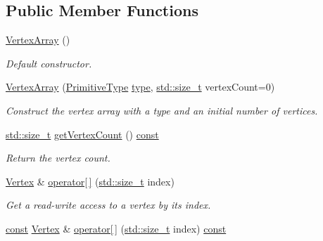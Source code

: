 \subsection*{Public Member Functions}
\begin{DoxyCompactItemize}
\item 
\hyperlink{classsf_1_1_vertex_array_a15729e01df8fc0021f9774dfb56295c1}{Vertex\-Array} ()
\begin{DoxyCompactList}\small\item\em Default constructor. \end{DoxyCompactList}\item 
\hyperlink{classsf_1_1_vertex_array_a4bb1c29a0e3354a035075899d84f02f9}{Vertex\-Array} (\hyperlink{group__graphics_ga5ee56ac1339984909610713096283b1b}{Primitive\-Type} \hyperlink{_entity_8cpp_aa209819775142a76b8e49319d79ecab2}{type}, \hyperlink{nc__alloc_8h_a7b60c5629e55e8ec87a4547dd4abced4}{std\-::size\-\_\-t} vertex\-Count=0)
\begin{DoxyCompactList}\small\item\em Construct the vertex array with a type and an initial number of vertices. \end{DoxyCompactList}\item 
\hyperlink{nc__alloc_8h_a7b60c5629e55e8ec87a4547dd4abced4}{std\-::size\-\_\-t} \hyperlink{classsf_1_1_vertex_array_afcf63214ffaf5903c818d7f2bf49970b}{get\-Vertex\-Count} () \hyperlink{term__entry_8h_a57bd63ce7f9a353488880e3de6692d5a}{const} 
\begin{DoxyCompactList}\small\item\em Return the vertex count. \end{DoxyCompactList}\item 
\hyperlink{classsf_1_1_vertex}{Vertex} \& \hyperlink{classsf_1_1_vertex_array_a6006676417d91f42d0278f1abcfe4352}{operator\mbox{[}$\,$\mbox{]}} (\hyperlink{nc__alloc_8h_a7b60c5629e55e8ec87a4547dd4abced4}{std\-::size\-\_\-t} index)
\begin{DoxyCompactList}\small\item\em Get a read-\/write access to a vertex by its index. \end{DoxyCompactList}\item 
\hyperlink{term__entry_8h_a57bd63ce7f9a353488880e3de6692d5a}{const} \hyperlink{classsf_1_1_vertex}{Vertex} \& \hyperlink{classsf_1_1_vertex_array_ab41c7768708eb55e8bb13eecce003cc4}{operator\mbox{[}$\,$\mbox{]}} (\hyperlink{nc__alloc_8h_a7b60c5629e55e8ec87a4547dd4abced4}{std\-::size\-\_\-t} index) \hyperlink{term__entry_8h_a57bd63ce7f9a353488880e3de6692d5a}{const} 

\end{DoxyCompactItemize}
